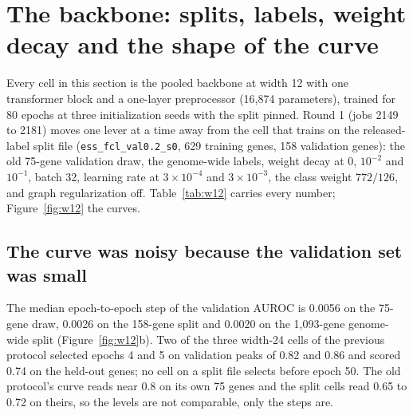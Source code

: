 
\section{The backbone: splits, labels, weight decay and the shape of the curve}
\label{sec:backbone}

Every cell in this section is the pooled backbone at width 12 with one transformer block
and a one-layer preprocessor (16,874 parameters), trained for 80 epochs at three
initialization seeds with the split pinned. Round 1 (jobs 2149 to 2181) moves one lever at
a time away from the cell that trains on the released-label split file
(\texttt{ess\_fcl\_val0.2\_s0}, 629 training genes, 158 validation genes):
the old 75-gene validation draw, the genome-wide labels, weight decay at 0, $10^{-2}$ and
$10^{-1}$, batch 32, learning rate at $3 \times 10^{-4}$ and $3 \times 10^{-3}$, the class
weight $772/126$, and graph regularization off. Table~\ref{tab:w12} carries every number;
Figure~\ref{fig:w12} the curves.




\subsection{The curve was noisy because the validation set was small}

The median epoch-to-epoch step of the validation AUROC is 0.0056 on the 75-gene draw,
0.0026 on the 158-gene split and 0.0020 on the 1,093-gene genome-wide split
(Figure~\ref{fig:w12}b). Two of the three width-24 cells of the previous protocol selected
epochs 4 and 5 on validation peaks of 0.82 and 0.86 and scored 0.74 on the held-out genes;
no cell on a split file selects before epoch 50. The old protocol's curve reads near 0.8 on
its own 75 genes and the split cells read 0.65 to 0.72 on theirs, so the levels are not
comparable, only the steps are.

